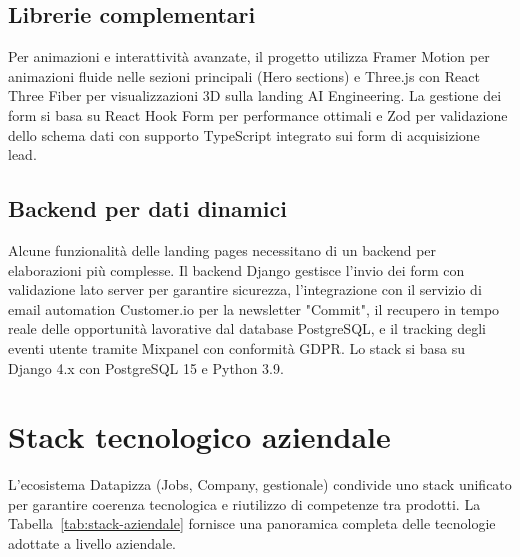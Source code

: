 \subsection{Librerie complementari}

Per animazioni e interattività avanzate, il progetto utilizza Framer Motion per 
animazioni fluide nelle sezioni principali (Hero sections) e Three.js con React 
Three Fiber per visualizzazioni 3D sulla landing AI Engineering. La gestione dei 
form si basa su React Hook Form per performance ottimali e Zod per validazione 
dello schema dati con supporto TypeScript integrato sui form di acquisizione 
lead.

\subsection{Backend per dati dinamici}

Alcune funzionalità delle landing pages necessitano di un backend per 
elaborazioni più complesse. Il backend Django gestisce l'invio dei form con 
validazione lato server per garantire sicurezza, l'integrazione con il servizio 
di email automation Customer.io per la newsletter "Commit", il recupero in tempo 
reale delle opportunità lavorative dal database PostgreSQL, e il tracking degli 
eventi utente tramite Mixpanel con conformità GDPR. Lo stack si basa su Django 
4.x con PostgreSQL 15 e Python 3.9.

\section{Stack tecnologico aziendale}

L'ecosistema Datapizza (Jobs, Company, gestionale) condivide uno stack 
unificato per garantire coerenza tecnologica e riutilizzo di competenze tra 
prodotti. La Tabella~\ref{tab:stack-aziendale} fornisce una panoramica 
completa delle tecnologie adottate a livello aziendale.

